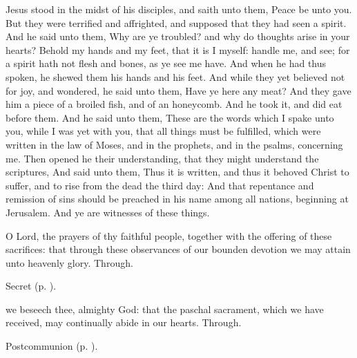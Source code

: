  Jesus stood in the midst of his disciples, and saith unto them, Peace be unto you. But they were terrified and affrighted, and supposed that they had seen a spirit. And he said unto them, Why are ye troubled? and why do thoughts arise in your hearts? Behold my hands and my feet, that it is I myself: handle me, and see; for a spirit hath not flesh and bones, as ye see me have. And when he had thus spoken, he shewed them his hands and his feet. And while they yet believed not for joy, and wondered, he said unto them, Have ye here any meat? And they gave him a piece of a broiled fish, and of an honeycomb. And he took it, and did eat before them. And he said unto them, These are the words which I spake unto you, while I was yet with you, that all things must be fulfilled, which were written in the law of Moses, and in the prophets, and in the psalms, concerning me. Then opened he their understanding, that they might understand the scriptures, And said unto them, Thus it is written, and thus it behoved Christ to suffer, and to rise from the dead the third day: And that repentance and remission of sins should be preached in his name among all nations, beginning at Jerusalem. And ye are witnesses of these things.


\clearpage
\secret
{} O Lord, the prayers of thy faithful people, together with the offering of these sacrifices: that through these observances of our bounden devotion we may attain unto heavenly glory. Through.
\begin{rubric}
     Secret  (p. \pageref{EasterSecret}).
\end{rubric}


\postcommunion
{} we beseech thee, almighty God: that the paschal sacrament, which we have received, may continually abide in our hearts. Through.


\begin{rubric}
     Postcommunion  (p. \pageref{EasterPostcommunion}).
\end{rubric}


